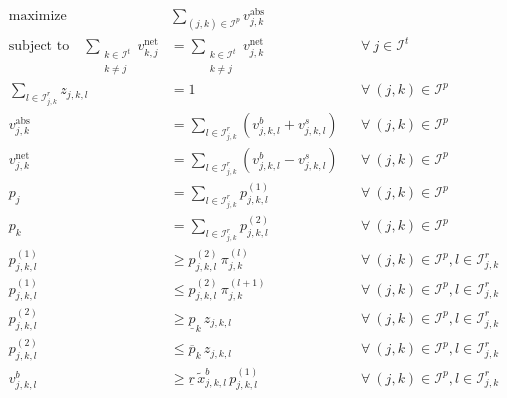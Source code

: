 \documentclass[11pt,parskip=full]{scrartcl}%
\newcommand*{\itokens}{\mathcal{I}^t}       %
\newcommand*{\itokenpairs}{\mathcal{I}^p}   %
\begin{document}
\begin{subequations}
\begin{align}
  \text{maximize} \quad & \sum\limits_{(j,k) \in \itokenpairs} v_{j,k}^\mathrm{abs}
  \label{eq:mip2_objective}
  \\[2mm]
  \text{subject to} \quad
  \sum_{\substack{k \in \itokens \\ k \neq j}} v_{k,j}^\mathrm{net}
  &= \sum_{\substack{k \in \itokens \\ k \neq j}} v_{j,k}^\mathrm{net}
  && \forall \> j \in \itokens
  \label{eq:mip2_tokenbalance}
  \\[2mm]
  \sum\limits_{l \in \mathcal{I}_{j,k}^r} z_{j,k,l} &= 1
  && \forall \> (j,k) \in \itokenpairs
  \label{eq:mip2_price_range}
  \\[2mm]
  v_{j,k}^\mathrm{abs}
  &= \sum\limits_{l {}\in \mathcal{I}_{j,k}^r} \left( v^b_{j,k,l} + v^s_{j,k,l} \right)
  && \forall \> (j,k) \in \itokenpairs
  \label{eq:mip2_volume_aggr_abs}
  \\[1mm]
  v_{j,k}^\mathrm{net}
  &= \sum\limits_{l \in \mathcal{I}_{j,k}^r} \left( v^b_{j,k,l} - v^s_{j,k,l} \right)
  && \forall \> (j,k) \in \itokenpairs
  \label{eq:mip2_volume_aggr_net}
  \\[1mm]
  p_j
  &= \sum\limits_{l \in \mathcal{I}_{j,k}^r} p^{(1)}_{j,k,l}
  && \forall \> (j,k) \in \itokenpairs
  \label{eq:mip2_price1_aggr}
  \\[1mm]
  p_k
  &= \sum\limits_{l \in \mathcal{I}_{j,k}^r} p^{(2)}_{j,k,l}
  && \forall \> (j,k) \in \itokenpairs
  \label{eq:mip2_price2_aggr}
  \\[4mm]
  p^{(1)}_{j,k,l}
  &\ge p^{(2)}_{j,k,l} \, \pi_{j,k}^{(l)}
  && \forall \> (j,k) \in \itokenpairs, l \in \mathcal{I}_{j,k}^r
  \label{eq:mip2_price1_lb}
  \\[1mm]
  p^{(1)}_{j,k,l}
  &\le p^{(2)}_{j,k,l} \, \pi_{j,k}^{(l+1)}
  && \forall \> (j,k) \in \itokenpairs, l \in \mathcal{I}_{j,k}^r
  \label{eq:mip2_price1_ub}
  \\[1mm]
  p^{(2)}_{j,k,l}
  &\ge \underline{p}_k \, z_{j,k,l}
  && \forall \> (j,k) \in \itokenpairs, l \in \mathcal{I}_{j,k}^r
  \label{eq:mip2_price2_lb}
  \\[1mm]
  p^{(2)}_{j,k,l}
  &\le \overline{p}_k \, z_{j,k,l}
  && \forall \> (j,k) \in \itokenpairs, l \in \mathcal{I}_{j,k}^r
  \label{eq:mip2_price2_ub}
  \\[2mm]
  v^b_{j,k,l}
  &\ge \underline{r} \, \tilde{x}^b_{j,k,l} \, p^{(1)}_{j,k,l}
  && \forall \> (j,k) \in \itokenpairs, l \in \mathcal{I}_{j,k}^r
  \label{eq:mip2_buyvolume_lb}

\end{align}
\end{subequations}
\end{document}
